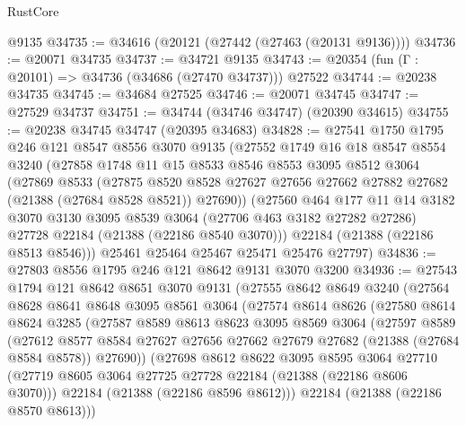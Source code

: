 \begin{lexlean}{RustCore}
\begin{coremodule}
    @9135
@34735 := @34616 (@20121 (@27442 (@27463 (@20131 @9136))))
@34736 := @20071 @34735
@34737 := @34721 @9135
@34743 := @20354 (fun (Γ : @20101) => @34736 (@34686 (@27470 @34737))) @27522
@34744 := @20238 @34735
@34745 := @34684 @27525
@34746 := @20071 @34745
@34747 := @27529 @34737
@34751 := @34744 (@34746 @34747) (@20390 @34615)
@34755 := @20238 @34745 @34747 (@20395 @34683)
@34828 := @27541
    @1750
    @1795
    @246
    @121
    @8547
    @8556
    @3070
    @9135
    (@27552
      @1749
      @16
      @18
      @8547
      @8554
      @3240
      (@27858
        @1748
        @11
        @15
        @8533
        @8546
        @8553
        @3095
        @8512
        @3064
        (@27869
          @8533
          (@27875
            @8520
            @8528
            @27627
            @27656
            @27662
            @27882
            @27682
            (@21388 (@27684 @8528 @8521))
            @27690))
        (@27560
          @464
          @177
          @11
          @14
          @3182
          @3070
          @3130
          @3095
          @8539
          @3064
          (@27706 @463 @3182 @27282 @27286)
          @27728
          @22184
          (@21388 (@22186 @8540 @3070)))
        @22184
        (@21388 (@22186 @8513 @8546)))
      @25461
      @25464
      @25467
      @25471
      @25476
      @27797)
@34836 := @27803 @8556 @1795 @246 @121 @8642 @9131 @3070 @3200
@34936 := @27543
    @1794
    @121
    @8642
    @8651
    @3070
    @9131
    (@27555
      @8642
      @8649
      @3240
      (@27564
        @8628
        @8641
        @8648
        @3095
        @8561
        @3064
        (@27574
          @8614
          @8626
          (@27580
            @8614
            @8624
            @3285
            (@27587
              @8589
              @8613
              @8623
              @3095
              @8569
              @3064
              (@27597
                @8589
                (@27612
                  @8577
                  @8584
                  @27627
                  @27656
                  @27662
                  @27679
                  @27682
                  (@21388 (@27684 @8584 @8578))
                  @27690))
              (@27698
                @8612
                @8622
                @3095
                @8595
                @3064
                @27710
                (@27719 @8605 @3064 @27725 @27728 @22184 (@21388 (@22186 @8606 @3070)))
                @22184
                (@21388 (@22186 @8596 @8612)))
              @22184
              (@21388 (@22186 @8570 @8613)))

\end{coremodule}
\end{lexlean}
